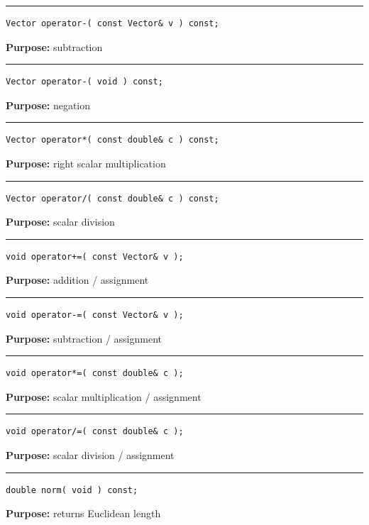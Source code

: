 \documentclass{article}
\begin{document}
\hspace{-.21in}\rule{5in}{1pt}
\begin{verbatim}
Vector operator-( const Vector& v ) const;
\end{verbatim}
\textbf{Purpose:}
subtraction

\hspace{-.21in}\rule{5in}{1pt}
\begin{verbatim}
Vector operator-( void ) const;
\end{verbatim}
\textbf{Purpose:}
negation

\hspace{-.21in}\rule{5in}{1pt}
\begin{verbatim}
Vector operator*( const double& c ) const;
\end{verbatim}
\textbf{Purpose:}
right scalar multiplication

\hspace{-.21in}\rule{5in}{1pt}
\begin{verbatim}
Vector operator/( const double& c ) const;
\end{verbatim}
\textbf{Purpose:}
scalar division

\hspace{-.21in}\rule{5in}{1pt}
\begin{verbatim}
void operator+=( const Vector& v );
\end{verbatim}
\textbf{Purpose:}
addition / assignment

\hspace{-.21in}\rule{5in}{1pt}
\begin{verbatim}
void operator-=( const Vector& v );
\end{verbatim}
\textbf{Purpose:}
subtraction / assignment

\hspace{-.21in}\rule{5in}{1pt}
\begin{verbatim}
void operator*=( const double& c );
\end{verbatim}
\textbf{Purpose:}
scalar multiplication / assignment

\hspace{-.21in}\rule{5in}{1pt}
\begin{verbatim}
void operator/=( const double& c );
\end{verbatim}
\textbf{Purpose:}
scalar division / assignment

\hspace{-.21in}\rule{5in}{1pt}
\begin{verbatim}
double norm( void ) const;
\end{verbatim}
\textbf{Purpose:}
returns Euclidean length
\end{document}
